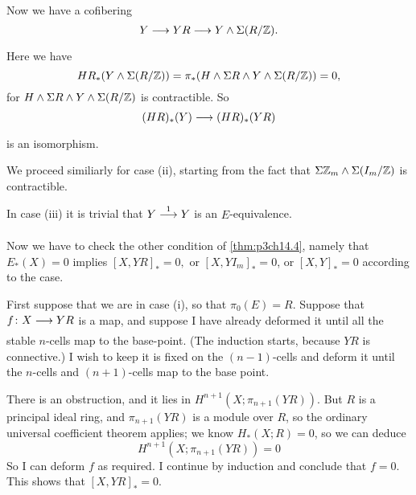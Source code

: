 \documentclass[../main]{subfiles}
\begin{document}
Now we have a cofibering 
\[
  Y \lar{} YR \lar{} Y \wedge \Sigma ( R /\bZ).
\] 
Here we have 
\[
  HR_{\ast}(Y \wedge \Sigma (R /\mathbb{Z})) = \pi_{\ast}(H \wedge \Sigma R \wedge Y \wedge \Sigma(R /\mathbb{Z}))=0, 
\] 
for $H \wedge \Sigma R \wedge Y \wedge \Sigma(R /\mathbb{Z})$ is contractible. So
\[
(HR)_{\ast}(Y) \lar{} (HR)_{\ast}(YR)
\] 
is an isomorphism. 

We proceed similiarly for case (ii), starting from the fact that $\Sigma \mathbb{Z}_{m} \wedge \Sigma ( I_{m} / \mathbb{Z})$ is contractible. 

In case (iii) it is trivial that $Y \vra{1} Y $ is an $E$-equivalence.

Now we have to check the other condition of \ref{thm:p3ch14.4}, namely that $E_{\ast}(X)=0$ implies $\left[X,YR\right]_{\ast}=0,$ or $\left[X,YI_{m}\right]_{\ast}=0$, or $\left[X,Y\right]_{\ast}=0$ according to the case.

First suppose that we are in case (i), so that $\pi_{0}(E)=R$. Suppose that $f\colon  X \lar{}  YR $ is a map, and suppose I have already deformed it until all the stable $n$-cells map to the base-point. (The induction starts, because $YR$ is connective.) I wish to keep it is fixed on the $(n-1)$-cells and deform it until the $n$-cells and $(n+1)$-cells map to the base point.

There is an obstruction, and it lies in $H^{n+1}(X;\pi_{n+1}(YR))$. But $R$ is a principal ideal ring, and $\pi_{n+1}(YR)$ is a module over $R$, so the ordinary universal coefficient theorem applies; we know $H_{\ast}(X;R)=0$, so we can deduce 
\[
H^{n+1}(X;\pi_{n+1}(YR))=0
\] 
So I can deform $f$ as required. I continue by induction and conclude that $f=0.$ This shows that  $\left[X,YR\right]_{\ast}=0$.
\end{document}
